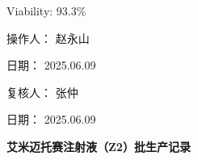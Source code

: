 \documentclass[UTF8,10pt,a4paper,fontset=fandol]{ctexart}
\newcommand{\fieldvalue}[1]{#1}
\newcommand{\handwritten}[1]{#1}
\begin{document}
\medskip
\noindent
Viability:
\fieldvalue{93.3\%}

\bigskip
\begin{center}
\begin{minipage}[t]{0.43\textwidth}
\centering
\fbox{\rule{0pt}{0.19\textheight}\rule{0.95\linewidth}{0pt}}
\end{minipage}
\hfill
\begin{minipage}[t]{0.43\textwidth}
\centering
\fbox{\rule{0pt}{0.19\textheight}\rule{0.95\linewidth}{0pt}}
\end{minipage}

\vspace{1.5cm}

\begin{minipage}[t]{0.43\textwidth}
\centering
\fbox{\rule{0pt}{0.19\textheight}\rule{0.95\linewidth}{0pt}}
\end{minipage}
\hfill
\begin{minipage}[t]{0.43\textwidth}
\centering
\fbox{\rule{0pt}{0.19\textheight}\rule{0.95\linewidth}{0pt}}
\end{minipage}
\end{center}

\vfill

\noindent
操作人：%
\fieldvalue{\handwritten{赵永山}}

\hfill
日期：%
\fieldvalue{\handwritten{2025.06.09}}

\medskip
\noindent
复核人：%
\fieldvalue{\handwritten{张仲}}

\hfill
日期：%
\fieldvalue{\handwritten{2025.06.09}}

\newpage

\begin{center}
{\large \textbf{艾米迈托赛注射液（Z2）批生产记录}}
\end{center}
\end{document}
